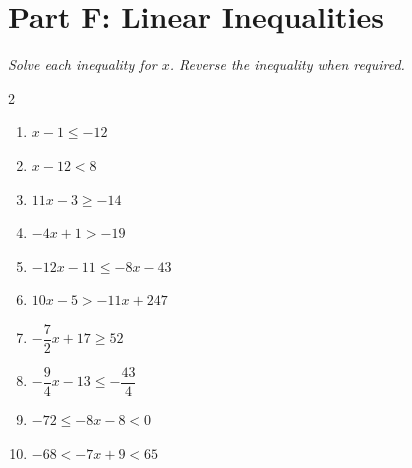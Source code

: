 \documentclass[11pt]{article}
\begin{document}
\section*{Part F: Linear Inequalities}
\noindent\textit{Solve each inequality for $x$. Reverse the inequality when required.}
\begin{multicols}{2}
\begin{enumerate}
  \item $x - 1 \le -12$
  \vspace{1.7cm}
  \item $x - 12 < 8$
  \vspace{1.7cm}
  \item $11x - 3 \ge -14$
  \vspace{1.7cm}
  \item $-4x + 1 > -19$
  \vspace{1.7cm}
  \item $-12x - 11 \le -8x - 43$
  \vspace{1.7cm}
  \item $10x - 5 > -11x + 247$
  \vspace{1.7cm}
  \item $-\dfrac{7}{2}x + 17 \ge 52$
  \vspace{1.7cm}
  \item $-\dfrac{9}{4}x - 13 \le -\dfrac{43}{4}$
  \vspace{1.7cm}
  \item $-72 \le -8x - 8 < 0$
  \vspace{1.7cm}
  \item $-68 < -7x + 9 < 65$
  \vspace{1.7cm}
\end{enumerate}
\end{multicols}
\end{document}
